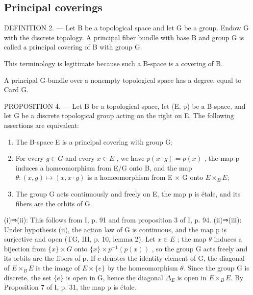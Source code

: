 \subsection{Principal coverings}

DEFINITION 2. --- Let B be a topological space and let G be a group. Endow G with the discrete topology. A principal fiber bundle with base B and group G is called a principal covering of B with group G.

This terminology is legitimate because such a B-space is a covering of B.

A principal G-bundle over a nonempty topological space has a degree, equal to Card G.

PROPOSITION 4. — Let B be a topological space, let (E, p) be a B-space, and let G be a discrete topological group acting on the right on E. The following assertions are equivalent:

\begin{enumerate}
\def\labelenumi{(\roman{enumi})}
\item
  The B-space E is a principal covering with group G;
\item
  For every \(g \in G\) and every \(x \in E\) , we have \(p(x \cdot g) = p(x)\) , the map p induces a homeomorphism from E/G onto B, and the map \(\theta: (x, g) \mapsto (x, x \cdot g)\) is a homeomorphism from E × G onto \(E \times_{B} E\);
\item
  The group G acts continuously and freely on E, the map p is étale, and its fibers are the orbits of G.
\end{enumerate}

(i)⇒(ii): This follows from I, p. 91 and from proposition 3 of I, p. 94. (ii)⇒(iii): Under hypothesis (ii), the action law of G is continuous, and the map p is surjective and open (TG, III, p. 10, lemma 2). Let \(x \in E\) ; the map \(\theta\) induces a bijection from \(\{x\} \times G\) onto \(\{x\} \times p^{-1}(p(x))\) , so the group G acts freely and its orbits are the fibers of p. If e denotes the identity element of G, the diagonal of \(E \times_{B} E\) is the image of \(E \times \{e\}\) by the homeomorphism \(\theta\). Since the group G is discrete, the set \(\{e\}\) is open in G, hence the diagonal \(\Delta_{E}\) is open in \(E \times_{B} E\). By Proposition 7 of I, p. 31, the map p is étale.

